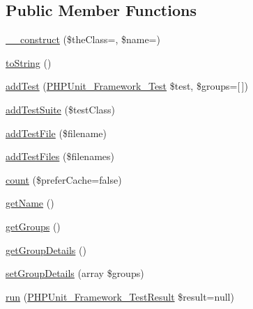 \subsection*{Public Member Functions}
\begin{DoxyCompactItemize}
\item 
\mbox{\hyperlink{class_p_h_p_unit___framework___test_suite_ad59b640510350acc22bee8a3738dacff}{\+\_\+\+\_\+construct}} (\$the\+Class=\textquotesingle{}\textquotesingle{}, \$name=\textquotesingle{}\textquotesingle{})
\item 
\mbox{\hyperlink{class_p_h_p_unit___framework___test_suite_a5558c5d549f41597377fa1ea8a1cefa3}{to\+String}} ()
\item 
\mbox{\hyperlink{class_p_h_p_unit___framework___test_suite_a8ae2adce084aba69f365a008cebb0380}{add\+Test}} (\mbox{\hyperlink{interface_p_h_p_unit___framework___test}{P\+H\+P\+Unit\+\_\+\+Framework\+\_\+\+Test}} \$test, \$groups=\mbox{[}$\,$\mbox{]})
\item 
\mbox{\hyperlink{class_p_h_p_unit___framework___test_suite_a4b1f67e35a90dbbed2a3eeb38f16d36a}{add\+Test\+Suite}} (\$test\+Class)
\item 
\mbox{\hyperlink{class_p_h_p_unit___framework___test_suite_acc636b8c97900d197d64de7cb35ed8c7}{add\+Test\+File}} (\$filename)
\item 
\mbox{\hyperlink{class_p_h_p_unit___framework___test_suite_a633ca1412e2918c325d55e9c3eadbfef}{add\+Test\+Files}} (\$filenames)
\item 
\mbox{\hyperlink{class_p_h_p_unit___framework___test_suite_aa40ec2fe423dde4e034bb06117fc8dde}{count}} (\$prefer\+Cache=false)
\item 
\mbox{\hyperlink{class_p_h_p_unit___framework___test_suite_a3d0963e68bb313b163a73f2803c64600}{get\+Name}} ()
\item 
\mbox{\hyperlink{class_p_h_p_unit___framework___test_suite_a6187b4fda76a8055bd08acafa57d9824}{get\+Groups}} ()
\item 
\mbox{\hyperlink{class_p_h_p_unit___framework___test_suite_ad47457e074241ecc982aa4a51ffe34f4}{get\+Group\+Details}} ()
\item 
\mbox{\hyperlink{class_p_h_p_unit___framework___test_suite_afc15f25fb6cfb16f54c2635a7d267e02}{set\+Group\+Details}} (array \$groups)
\item 
\mbox{\hyperlink{class_p_h_p_unit___framework___test_suite_aba2e5a83092b40735a7a61c572cd6256}{run}} (\mbox{\hyperlink{class_p_h_p_unit___framework___test_result}{P\+H\+P\+Unit\+\_\+\+Framework\+\_\+\+Test\+Result}} \$result=null)

\end{DoxyCompactItemize}
